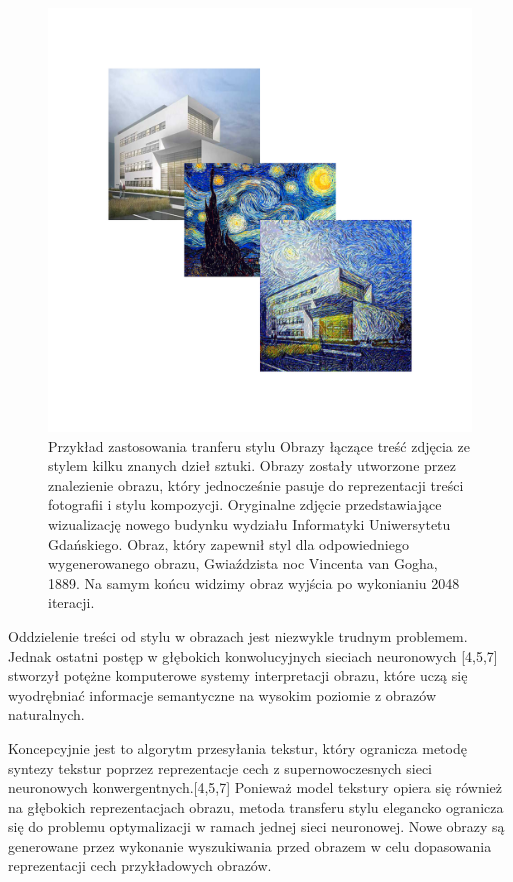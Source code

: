 \documentclass[brudnopis]{xmgr}
\begin{document}
 \begin{figure}[!tbh]
\centering
\includegraphics[width=.8\hsize]{fig/6}
\caption{Przykład zastosowania tranferu stylu
Obrazy łączące treść zdjęcia ze stylem kilku znanych dzieł sztuki. Obrazy zostały utworzone przez znalezienie obrazu, który jednocześnie pasuje do reprezentacji treści fotografii i stylu kompozycji. Oryginalne zdjęcie przedstawiające wizualizację nowego budynku wydziału Informatyki Uniwersytetu Gdańskiego. Obraz, który zapewnił styl dla odpowiedniego wygenerowanego obrazu, Gwiaździsta noc Vincenta van Gogha, 1889. Na samym końcu widzimy obraz wyjścia po wykonianiu 2048 iteracji.
\label{RYS.6}}
\end{figure}

Oddzielenie treści od stylu w obrazach jest niezwykle trudnym problemem. Jednak ostatni postęp w głębokich konwolucyjnych sieciach neuronowych [4,5,7] stworzył potężne komputerowe systemy interpretacji obrazu, które uczą się wyodrębniać informacje semantyczne na wysokim poziomie z obrazów naturalnych.

Koncepcyjnie jest to algorytm przesyłania tekstur, który ogranicza metodę syntezy tekstur poprzez reprezentacje cech z supernowoczesnych sieci neuronowych konwergentnych.[4,5,7] Ponieważ model tekstury opiera się również na głębokich reprezentacjach obrazu, metoda transferu stylu elegancko ogranicza się do problemu optymalizacji w ramach jednej sieci neuronowej. Nowe obrazy są generowane przez wykonanie wyszukiwania przed obrazem w celu dopasowania reprezentacji cech przykładowych obrazów.
\end{document}
